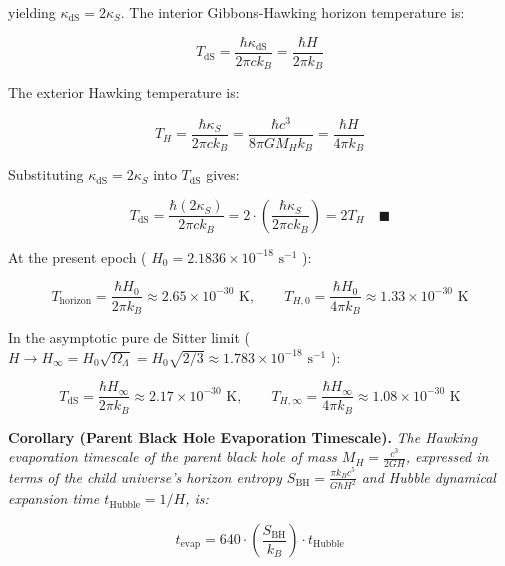 \documentclass[11pt,a4paper]{article}
\theoremstyle{definition}\newtheorem{definition}{Definition}
\theoremstyle{remark}\newtheorem{remark}{Remark}
\begin{document}
yielding $\kappa_{\text{dS}} = 2\kappa_S$. The interior Gibbons-Hawking horizon temperature is:


\begin{equation}
T_{\text{dS}} = \frac{\hbar \kappa_{\text{dS}}}{2\pi c k_B} = \frac{\hbar H}{2\pi k_B}
\end{equation}


The exterior Hawking temperature is:


\begin{equation}
T_H = \frac{\hbar \kappa_S}{2\pi c k_B} = \frac{\hbar c^3}{8\pi G M_H k_B} = \frac{\hbar H}{4\pi k_B}
\end{equation}


Substituting $\kappa_{\text{dS}} = 2\kappa_S$ into $T_{\text{dS}}$ gives:


\begin{equation}
T_{\text{dS}} = \frac{\hbar (2\kappa_S)}{2\pi c k_B} = 2 \cdot \left(\frac{\hbar \kappa_S}{2\pi c k_B}\right) = 2 T_H \quad \blacksquare
\end{equation}


At the present epoch ( $H_0 = 2.1836 \times 10^{-18} \text{ s}^{-1}$ ):


\begin{equation}
T_{\text{horizon}} = \frac{\hbar H_0}{2\pi k_B} \approx 2.65 \times 10^{-30} \text{ K}, \qquad T_{H,0} = \frac{\hbar H_0}{4\pi k_B} \approx 1.33 \times 10^{-30} \text{ K}
\end{equation}


In the asymptotic pure de Sitter limit ( $H \to H_\infty = H_0 \sqrt{\Omega_\Lambda} = H_0 \sqrt{2/3} \approx 1.783 \times 10^{-18} \text{ s}^{-1}$ ):


\begin{equation}
T_{\text{dS}} = \frac{\hbar H_\infty}{2\pi k_B} \approx 2.17 \times 10^{-30} \text{ K}, \qquad T_{H,\infty} = \frac{\hbar H_\infty}{4\pi k_B} \approx 1.08 \times 10^{-30} \text{ K}
\end{equation}


\textbf{Corollary (Parent Black Hole Evaporation Timescale).} \textit{The Hawking evaporation timescale of the parent black hole of mass $M_H = \frac{c^3}{2GH}$, expressed in terms of the child universe's horizon entropy $S_{\text{BH}} = \frac{\pi k_B c^5}{G\hbar H^2}$ and Hubble dynamical expansion time $t_{\text{Hubble}} = 1/H$, is:}


\begin{equation}
t_{\text{evap}} = 640 \cdot \left(\frac{S_{\text{BH}}}{k_B}\right) \cdot t_{\text{Hubble}}
\end{equation}
\end{document}

